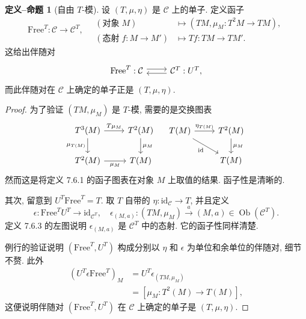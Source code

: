 \documentclass[11pt]{article}
\newcommand{\identity}{\mathrm{id}}
\newcommand{\Obj}{\operatorname{Ob}}
\renewcommand{\index}[2][]{\relax}
\newcommand{\CorpusNumber}{0}
\theoremstyle{definition}
\newtheorem{definition-proposition}[theorem]{定义--命题}
\begin{document}
\def\CorpusNumber{7.6.6}
\begin{definition-proposition}[自由 $T$-模]\label{def:free-T-Alg}
	\index{mo!自由 (free)}
	设 $(T, \mu, \eta)$ 是 $\mathcal{C}$ 上的单子. 定义函子
	\[ \mathrm{Free}^T: \mathcal{C} \to \mathcal{C}^T , \quad
	\begin{array}{rl}
		(\text{对象}\; M) & \mapsto (TM, \mu_M: T^2 M \to TM), \\
		(\text{态射}\; f: M \to M') & \mapsto Tf: TM \to TM'.
	\end{array}\]
	这给出伴随对
	\[\begin{tikzcd}
		\mathrm{Free}^T : \mathcal{C} \arrow[shift left, r] & \mathcal{C}^T: U^T \arrow[shift left, l],
	\end{tikzcd}\]
	而此伴随对在 $\mathcal{C}$ 上确定的单子正是 $(T, \mu, \eta)$.
\end{definition-proposition}
\begin{proof}
	为了验证 $(TM, \mu_M)$ 是 $T$-模, 需要的是交换图表
	\[\begin{tikzcd}
		T^3 (M) \arrow[r, "T\mu_M"] \arrow[d, "\mu_{T(M)}"'] & T^2(M) \arrow[d, "\mu_M"] \\
		T^2 (M) \arrow[r, "\mu_M"'] & T(M)
	\end{tikzcd} \quad \begin{tikzcd}
		T(M) \arrow[r, "\eta_{T(M)}"] \arrow[rd, "\identity"'] & T^2(M) \arrow[d, "\mu_M"] \\
		& T(M)
	\end{tikzcd}\]
	然而这是将定义 7.6.1 的函子图表在对象 $M$ 上取值的结果. 函子性是清晰的.
	
	其次, 留意到 $U^T \mathrm{Free}^T = T$. 取 $T$ 自带的 $\eta: \identity_{\mathcal{C}} \to T$, 并且定义
	\[ \epsilon: \mathrm{Free}^T U^T \to \identity_{\mathcal{C}^T}, \quad
	\epsilon_{(M, a)}: (TM, \mu_M) \xrightarrow{a} (M, a) \in \Obj(\mathcal{C}^T). \]
	定义 7.6.3 的左图说明 $\epsilon_{(M, a)}$ 是 $\mathcal{C}^T$ 中的态射. 它的函子性同样清楚.
	
	例行的验证说明 $(\mathrm{Free}^T, U^T)$ 构成分别以 $\eta$ 和 $\epsilon$ 为单位和余单位的伴随对, 细节不赘. 此外
	\begin{equation*}\begin{aligned}
		\left(U^T \epsilon \mathrm{Free}^T\right)_M & = U^T \epsilon_{(TM, \mu_M)} \\
		& = \left[ \mu_M: T^2(M) \to T(M)\right],
	\end{aligned}\end{equation*}
	这便说明伴随对 $(\mathrm{Free}^T, U^T)$ 在 $\mathcal{C}$ 上确定的单子是 $(T, \mu, \eta)$.
\end{proof}
\end{document}
